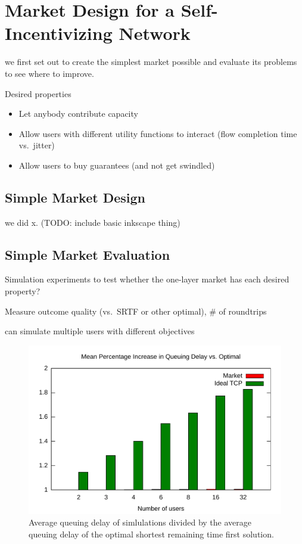 \section{Market Design for a Self-Incentivizing Network}
\label{sec:designs}
we first set out to create the simplest market possible and evaluate its problems to see where to improve.

Desired properties

\begin{itemize}

\item Let anybody contribute capacity

\item Allow users with different utility functions to interact (flow completion time vs.~jitter)

\item Allow users to buy guarantees (and not get swindled)

\end{itemize}

\subsection{Simple Market Design}
we did x. (TODO: include basic inkscape thing)

\subsection{Simple Market Evaluation}

Simulation experiments to test whether the one-layer market has each desired property?

Measure outcome quality (vs.~SRTF or other optimal), \# of roundtrips

can simulate multiple users with different objectives

\begin{figure}
\includegraphics[width=\columnwidth]{plots/delay_over_srtf.pdf}
\caption{Average queuing delay of simlulations divided by the average queuing delay of the optimal shortest remaining time first solution.}
\label{f:delay_over_srtf}
\end{figure}

